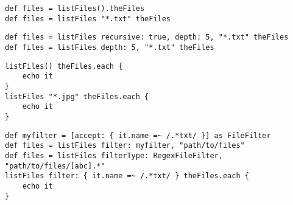 \begin{lstlisting}[style=Groovybash, label={lst:example_listFiles_simple}, title={%
List files in the current working directory.}]
def files = listFiles().theFiles
def files = listFiles "*.txt" theFiles
\end{lstlisting}

\begin{lstlisting}[style=Groovybash, label={lst:example_listFiles_arguments}, title={%
List files in the current working directory with some additional arguments.}]
def files = listFiles recursive: true, depth: 5, "*.txt" theFiles
def files = listFiles depth: 5, "*.txt" theFiles
\end{lstlisting}

\begin{lstlisting}[style=Groovybash, label={lst:example_listFiles_iterate}, title={%
Iterate over the found files.}]
listFiles() theFiles.each {
    echo it
}
listFiles "*.jpg" theFiles.each {
    echo it
}
\end{lstlisting}

\begin{lstlisting}[style=Groovybash, label={lst:example_listFiles_filter}, title={%
List files using a custom file filter.}]
def myfilter = [accept: { it.name =~ /.*txt/ }] as FileFilter
def files = listFiles filter: myfilter, "path/to/files"
def files = listFiles filterType: RegexFileFilter, "path/to/files/[abc].*"
listFiles filter: { it.name =~ /.*txt/ } theFiles.each {
    echo it
}
\end{lstlisting}

